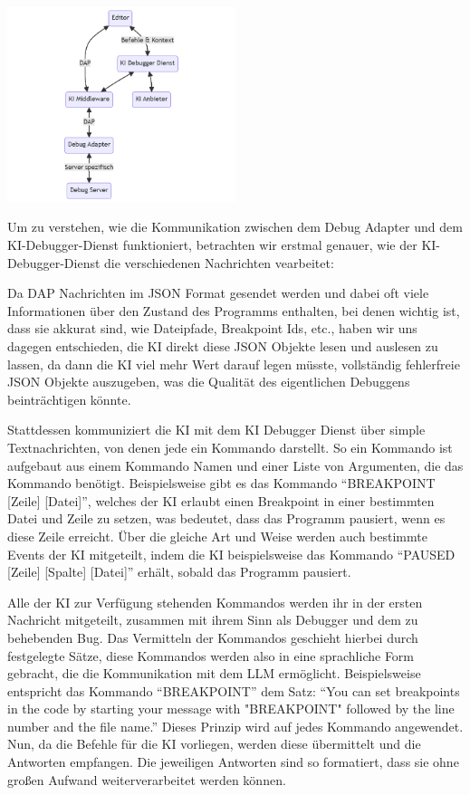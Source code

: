 \documentclass[a4paper,12pt,ngerman]{scrartcl}
\begin{document}
\begin{center}	
	\includegraphics[width=0.5\textwidth]{ai_integration}
\end{center}

Um zu verstehen, wie die Kommunikation zwischen dem Debug Adapter und dem KI-Debugger-Dienst funktioniert, betrachten wir erstmal genauer, wie der KI-Debugger-Dienst die verschiedenen Nachrichten vearbeitet:

Da DAP Nachrichten im JSON Format gesendet werden und dabei oft viele Informationen über den Zustand des Programms enthalten, bei denen wichtig ist, dass sie akkurat sind, wie Dateipfade, Breakpoint Ids, etc., haben wir uns dagegen entschieden, die KI direkt diese JSON Objekte lesen und auslesen zu lassen, da dann die KI viel mehr Wert darauf legen müsste, vollständig fehlerfreie JSON Objekte auszugeben, was die Qualität des eigentlichen Debuggens beinträchtigen könnte.

Stattdessen kommuniziert die KI mit dem KI Debugger Dienst über simple Textnachrichten, von denen jede ein Kommando darstellt. So ein Kommando ist aufgebaut aus einem Kommando Namen und einer Liste von Argumenten, die das Kommando benötigt. Beispielsweise gibt es das Kommando ``BREAKPOINT [Zeile] [Datei]'', welches der KI erlaubt einen Breakpoint in einer bestimmten Datei und Zeile zu setzen, was bedeutet, dass das Programm pausiert, wenn es diese Zeile erreicht. Über die gleiche Art und Weise werden auch bestimmte Events der KI mitgeteilt, indem die KI beispielsweise das Kommando ``PAUSED [Zeile] [Spalte] [Datei]'' erhält, sobald das Programm pausiert.

Alle der KI zur Verfügung stehenden Kommandos werden ihr in der ersten Nachricht mitgeteilt, zusammen mit ihrem Sinn als Debugger und dem zu behebenden Bug. Das Vermitteln der Kommandos geschieht hierbei durch festgelegte Sätze, diese Kommandos werden also in eine sprachliche Form gebracht, die die Kommunikation mit dem LLM ermöglicht. Beispielsweise entspricht das Kommando ``BREAKPOINT'' dem Satz: ``You can set breakpoints in the code by starting your message with "BREAKPOINT" followed by the line number and the file name.'' Dieses Prinzip wird auf jedes Kommando angewendet. Nun, da die Befehle für die KI vorliegen, werden diese übermittelt und die Antworten empfangen. Die jeweiligen Antworten sind so formatiert, dass sie ohne großen Aufwand weiterverarbeitet werden können.
\end{document}
